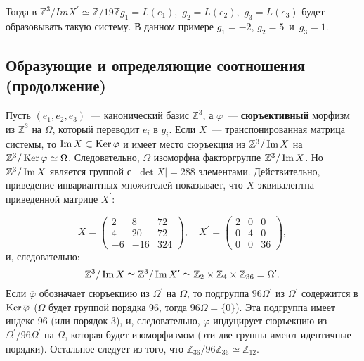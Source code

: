 \documentclass{../../template/mai_book}
\begin{document}
    \newpage
    \noindent Тогда в $\mathbb{Z}^3/ImX^\prime \simeq \mathbb{Z}/19\mathbb{Z}$\quad\quad$g_1 = \overline{L(e_1)},\,\,g_2 = \overline{L(e_2)},\,\,g_3 = \overline{L(e_3)}$ будет образовывать такую систему. В данном примере $g_1 = -2,\,g_2 = 5\,$ и $\,g_3 = 1$.
    \subsection{\normalsize{Образующие и определяющие соотношения (продолжение)}}

    Пусть $(e_1, e_2, e_3)$~— канонический базис $\mathbb{Z}^3$, а $\varphi$~— {\bf{сюръективный}} морфизм из $\mathbb{Z}^3$ на $\Omega$, который переводит $e_i$ в $g_i$. Если $X$~— транспонированная матрица системы, то $\operatorname{Im} X \subset \operatorname{Ker}
    \varphi$ и имеет место сюръекция из $\mathbb{Z}^3/\operatorname{Im} X$ на $\mathbb{Z}^3/\operatorname{Ker} \varphi \simeq \Omega$. Следовательно, $\Omega$ изоморфна факторгруппе $\mathbb{Z}^3/\operatorname{Im} X$. Но $\mathbb{Z}^3/\operatorname{Im} X$ является группой с $|\det X| = 288$ элементами. Действительно, приведение инвариантных множителей показывает, что $X$ эквивалентна приведенной матрице $X^\prime$:

    $$ X = \begin{pmatrix}
    2 & 8 & 72\\
    4 & 20 & 72\\
    -6 & -16 & 324
    \end{pmatrix},\quad X^\prime = \begin{pmatrix}
    2 & 0 & 0\\
    0 & 4 & 0\\
    0 & 0 & 36
    \end{pmatrix},$$
    и, следовательно:
    $$\mathbb{Z}^3/\operatorname{Im} X \simeq \mathbb{Z}^3/\operatorname{Im} X^\prime \simeq \mathbb{Z}_2 \times \mathbb{Z}_4 \times \mathbb{Z}_{36} = \Omega^\prime.$$
    Если $\overline\varphi$ обозначает сюръекцию из $\Omega^\prime$ на $\Omega$, то подгруппа $96\Omega^\prime$ из $\Omega^\prime$ содержится в $\operatorname{Ker}\overline\varphi$ ($\Omega$ будет группой порядка 96, тогда $96\Omega = \{0\}$). Эта подгруппа имеет индекс 96 (или порядок 3), и, следовательно, $\overline\varphi$ индуцирует сюръекцию из $\Omega^\prime/96\Omega^\prime$ на $\Omega$, которая будет изоморфизмом (эти две группы имеют идентичные порядки). Остальное следует из того, что $\mathbb{Z}_{36}/96\mathbb{Z}_{36}\simeq \mathbb{Z}_{12}$.
\end{document}
